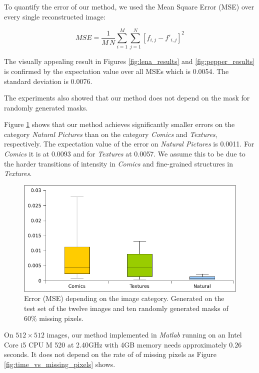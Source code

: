 \documentclass[10pt,conference,compsocconf]{IEEEtran}
\begin{document}
To quantify the error of our method, we used the Mean Square Error (MSE) over every single reconstructed image:

\begin{equation}
\label{eqn:mse}
\mathit{MSE} = \frac{1}{M\,N}\sum_{i=1}^{M}\sum_{j=1}^{N} [f_{i,j} - f'_{i,j}]^2
\end{equation}


The visually appealing result in Figures \ref{fig:lena_results} and \ref{fig:pepper_results} is confirmed by the expectation value over all MSEs which is 0.0054. The standard deviation is 0.0076.

The experiments also showed that our method does not depend on the mask for randomly generated masks.

Figure \ref{fig:error_vs_category} shows that our method achieves significantly smaller errors on the category  \emph{Natural Pictures} than on the category \emph{Comics} and \emph{Textures}, respectively. The expectation value of the error on \emph{Natural Pictures} is 0.0011. For \emph{Comics} it is at 0.0093 and for \emph{Textures} at 0.0057. We assume this to be due to the harder transitions of intensity in \emph{Comics} and fine-grained structures in \emph{Textures}.

\begin{figure}[ht]
\centering
 \includegraphics[width = \linewidth]{images/errorDependingOnCategorie.pdf}
\caption[]{Error (MSE) depending on the image category. Generated on the test set of the twelve images and ten randomly generated masks of $60\%$ missing pixels.\label{fig:error_vs_category}}
\end{figure}

On $512 \times 512$ images, our method implemented in \emph{Matlab} running on an Intel Core i5 CPU M 520 at 2.40GHz with 4GB memory needs approximately $0.26$ seconds. It does not depend on the rate of of missing pixels as Figure \ref{fig:time_vs_missing_pixels} shows.
\end{document}
